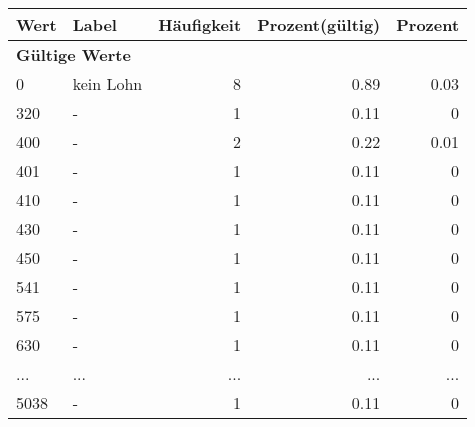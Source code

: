     \begin{longtable}{lXrrr}
     \toprule
     \textbf{Wert} & \textbf{Label} & \textbf{Häufigkeit} & \textbf{Prozent(gültig)} & \textbf{Prozent} \\
     \endhead
     \midrule
     \multicolumn{5}{l}{\textbf{Gültige Werte}}\\
        0 & \multicolumn{1}{X}{kein Lohn} & %
          \num{8} &
          \num[round-mode=places,round-precision=2]{0.89} &
          \num[round-mode=places,round-precision=2]{0.03} \\
        320 & \multicolumn{1}{X}{-} & %
          \num{1} &
          \num[round-mode=places,round-precision=2]{0.11} &
          \num[round-mode=places,round-precision=2]{0} \\
        400 & \multicolumn{1}{X}{-} & %
          \num{2} &
          \num[round-mode=places,round-precision=2]{0.22} &
          \num[round-mode=places,round-precision=2]{0.01} \\
        401 & \multicolumn{1}{X}{-} & %
          \num{1} &
          \num[round-mode=places,round-precision=2]{0.11} &
          \num[round-mode=places,round-precision=2]{0} \\
        410 & \multicolumn{1}{X}{-} & %
          \num{1} &
          \num[round-mode=places,round-precision=2]{0.11} &
          \num[round-mode=places,round-precision=2]{0} \\
        430 & \multicolumn{1}{X}{-} & %
          \num{1} &
          \num[round-mode=places,round-precision=2]{0.11} &
          \num[round-mode=places,round-precision=2]{0} \\
        450 & \multicolumn{1}{X}{-} & %
          \num{1} &
          \num[round-mode=places,round-precision=2]{0.11} &
          \num[round-mode=places,round-precision=2]{0} \\
        541 & \multicolumn{1}{X}{-} & %
          \num{1} &
          \num[round-mode=places,round-precision=2]{0.11} &
          \num[round-mode=places,round-precision=2]{0} \\
        575 & \multicolumn{1}{X}{-} & %
          \num{1} &
          \num[round-mode=places,round-precision=2]{0.11} &
          \num[round-mode=places,round-precision=2]{0} \\
        630 & \multicolumn{1}{X}{-} & %
          \num{1} &
          \num[round-mode=places,round-precision=2]{0.11} &
          \num[round-mode=places,round-precision=2]{0} \\
       ... & ... & ... & ... & ... \\
        5038 & \multicolumn{1}{X}{-} & %
          \num{1} &
          \num[round-mode=places,round-precision=2]{0.11} &
          \num[round-mode=places,round-precision=2]{0} \\


\end{longtable}
